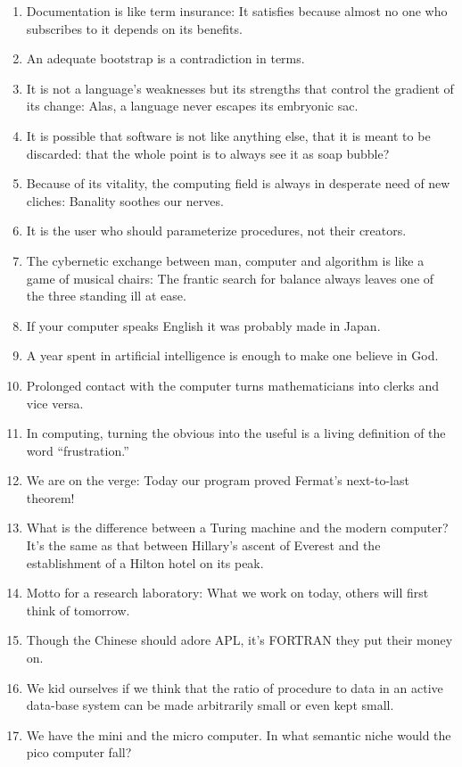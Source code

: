 \documentclass[letterpaper,11pt]{article}
\begin{document}
\begin{multicols}{2}
\begin{enumerate}[wide=0pt,label=\textbf{\arabic*.}]
\item Documentation is like term insurance: It satisfies because almost no one who subscribes to it depends on its benefits.
\item An adequate bootstrap is a contradiction in terms.
\item It is not a language's weaknesses but its strengths that control the gradient of its change: Alas, a language never escapes its embryonic sac.
\item It is possible that software is not like anything else, that it is meant to be discarded: that the whole point is to always see it as soap bubble?
\item Because of its vitality, the computing field is always in desperate need of new cliches: Banality soothes our nerves.
\item It is the user who should parameterize procedures, not their creators.
\item The cybernetic exchange between man, computer and algorithm is like a game of musical chairs: The frantic search for balance always leaves one of the three standing ill at ease.
\item If your computer speaks English it was probably made in Japan.
\item A year spent in artificial intelligence is enough to make one believe in God.
\item Prolonged contact with the computer turns mathematicians into clerks and vice versa.
\item In computing, turning the obvious into the useful is a living definition of the word ``frustration.''
\item We are on the verge: Today our program proved Fermat's next-to-last theorem!
\item What is the difference between a Turing machine and the modern computer? It's the same as that between Hillary's ascent of Everest and the establishment of a Hilton hotel on its peak.
\item Motto for a research laboratory: What we work on today, others will first think of tomorrow.
\item Though the Chinese should adore APL, it's FORTRAN they put their money on.
\item We kid ourselves if we think that the ratio of procedure to data in an active data-base system can be made arbitrarily small or even kept small.
\item We have the mini and the micro computer. In what semantic niche would the pico computer fall?

\end{enumerate}
\end{multicols}
\end{document}
